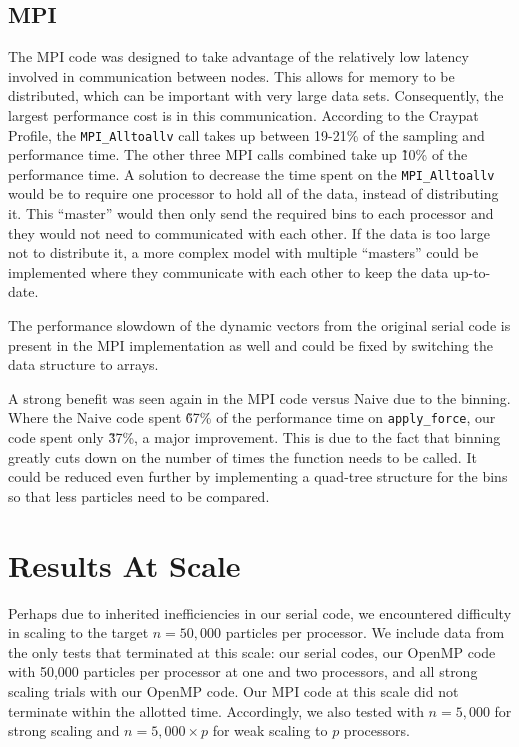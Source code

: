 \documentclass{article}
\begin{document}
\subsection{MPI}
The MPI code was designed to take advantage of the relatively low latency
involved in communication between nodes. This allows for memory to be
distributed, which can be important with very large data sets. Consequently, the
largest performance cost is in this communication. According to the Craypat
Profile, the \texttt{MPI\_Alltoallv} call takes up between 19-21\% of the
sampling and performance time. The other three MPI calls combined take up \~10\%
of the performance time. A solution to decrease the time spent on the
\texttt{MPI\_Alltoallv} would be to require one processor to hold all of the
data, instead of distributing it.  This “master” would then only send the
required bins to each processor and they would not need to communicated with
each other. If the data is too large not to distribute it, a more complex model
with multiple “masters” could be implemented where they communicate with each
other to keep the data up-to-date.

The performance slowdown of the dynamic vectors from the original serial code is
present in the MPI implementation as well and could be fixed by switching the
data structure to arrays.

A strong benefit was seen again in the MPI code versus Naive due to the binning.
Where the Naive code spent \~67\% of the performance time on
\texttt{apply\_force}, our code spent only \~37\%, a major improvement. This is
due to the fact that binning greatly cuts down on the number of times the
function needs to be called. It could be reduced even further by implementing a
quad-tree structure for the bins so that less particles need to be compared.
\section{Results At Scale}\label{section:scale}
Perhaps due to inherited inefficiencies in our serial code, we encountered
difficulty in scaling to the target $n = 50,000$ particles per processor. We
include data from the only tests that terminated at this scale: our serial
codes, our OpenMP code with 50,000 particles per processor at one and two
processors, and all strong scaling trials with our OpenMP code. Our MPI code at
this scale did not terminate within the allotted time. Accordingly, we also
tested with $n = 5,000$ for strong scaling and $n = 5,000 \times p$ for weak
scaling to $p$ processors.
\end{document}
